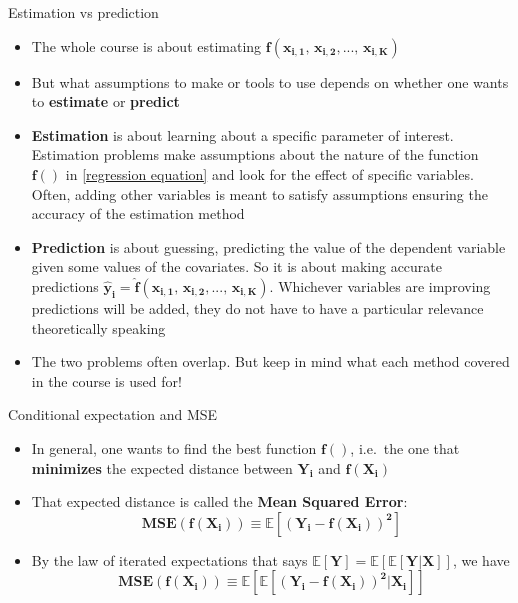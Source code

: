 \documentclass[
  ignorenonframetext,
  aspectratio=169]{beamer}
\providecommand{\tightlist}{%
  \setlength{\itemsep}{0pt}\setlength{\parskip}{0pt}}
\begin{document}
\begin{frame}{Estimation vs prediction}
\protect\hypertarget{estimation-vs-prediction}{}
\label{est vs pred}

\begin{itemize}
\tightlist
\item
  The whole course is about estimating
  \(\bm{f(x_{i,1},\,x_{i,2},..., \, x_{i,K})}\)
\item
  But what assumptions to make or tools to use depends on whether one
  wants to \textbf{estimate} or \textbf{predict}
\item
  \textbf{Estimation} is about learning about a specific parameter of
  interest. Estimation problems make assumptions about the nature of the
  function \(\bm{f()}\) in \eqref{regression equation} and look for the
  effect of specific variables. Often, adding other variables is meant
  to satisfy assumptions ensuring the accuracy of the estimation method
\item
  \textbf{Prediction} is about guessing, predicting the value of the
  dependent variable given some values of the covariates. So it is about
  making accurate predictions
  \(\bm{\hat{y}_i=\hat{f}(x_{i,1},\,x_{i,2},..., \, x_{i,K})}\).
  Whichever variables are improving predictions will be added, they do
  not have to have a particular relevance theoretically speaking
\item
  The two problems often overlap. But keep in mind what each method
  covered in the course is used for!
\end{itemize}
\end{frame}

\begin{frame}{Conditional expectation and MSE}
\protect\hypertarget{conditional-expectation-and-mse}{}
\begin{itemize}
\item
  In general, one wants to find the best function \(\bm{f()}\), i.e.~the
  one that \textbf{minimizes} the expected distance between \(\bm{Y_i}\)
  and \(\bm{f(X_i)}\)
\item
  That expected distance is called the \textbf{Mean Squared Error}: \[
  \bm{  MSE(f(X_i)) \equiv \mathbb{E} [(Y_i - f(X_i))^2] }
  \]
\item
  By the law of iterated expectations that says
  \(\bm{\mathbb{E}[Y]=\mathbb{E}[\mathbb{E}[Y|X]]}\), we have \[
  \bm{  MSE(f(X_i)) \equiv \mathbb{E} \left[ \mathbb{E} [(Y_i - f(X_i))^2|X_i]\right] }
  \]
\end{itemize}
\end{frame}
\end{document}
